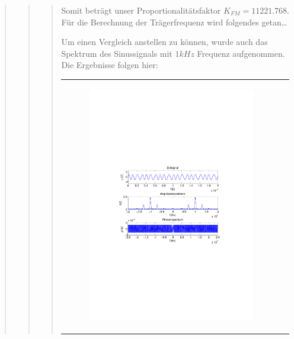 \begin{quote}
\begin{quote}
\begin{quote}
        
        Somit beträgt unser Proportionalitätsfaktor $K_{FM} = 11221.768$.\\
        
        Für die Berechnung der Trägerfrequenz wird folgendes getan\ldots \\
        
        Um einen Vergleich anstellen zu können, wurde auch das Spektrum des
        Sinussignals mit $1 kHz$ Frequenz aufgenommen. Die Ergebnisse folgen
        hier:
        
                \begin{center}
            \begin{tabular}{ll}

            \hspace{-10em}
                \begin{minipage}{0.6\textwidth}

                    \begin{figure}[H]
                        \includegraphics[scale=0.5, trim = 4cm 9.5cm 3.5cm
                        9.5cm, clip]{./Bilder/spektrum_sin3kHz}
               

\end{figure}
\end{minipage}
\end{tabular}
\end{center}
\end{quote}
\end{quote}
\end{quote}
